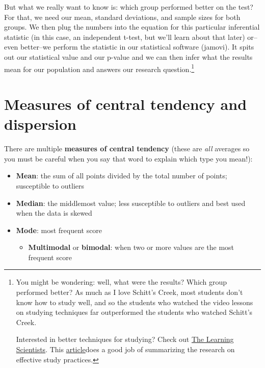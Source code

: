 \documentclass[
]{book}
\providecommand{\tightlist}{%
  \setlength{\itemsep}{0pt}\setlength{\parskip}{0pt}}
\begin{document}
But what we really want to know is: which group performed better on the test? For that, we need our mean, standard deviations, and sample sizes for both groups. We then plug the numbers into the equation for this particular inferential statistic (in this case, an independent t-test, but we'll learn about that later) or--even better--we perform the statistic in our statistical software (jamovi). It spits out our statistical value and our p-value and we can then infer what the results mean for our population and answers our research question.\footnote{You might be wondering: well, what were the results? Which group performed better? As much as I love Schitt's Creek, most students don't know how to study well, and so the students who watched the video lessons on studying techniques far outperformed the students who watched Schitt's Creek.

  Interested in better techniques for studying? Check out \href{https://www.learningscientists.org/blog/category/For+Students}{The Learning Scientists}. This \href{https://www.learningscientists.org/blog/2020/1/9-1}{article}does a good job of summarizing the research on effective study practices.}

\hypertarget{measures-of-central-tendency-and-dispersion}{%
\section{Measures of central tendency and dispersion}\label{measures-of-central-tendency-and-dispersion}}

There are multiple \textbf{measures of central tendency} (these are \emph{all} averages so you must be careful when you say that word to explain which type you mean!):

\begin{itemize}
\item
  \textbf{Mean}: the sum of all points divided by the total number of points; susceptible to outliers
\item
  \textbf{Median}: the middlemost value; less susceptible to outliers and best used when the data is skewed
\item
  \textbf{Mode}: most frequent score

  \begin{itemize}
  \tightlist
  \item
    \textbf{Multimodal} or \textbf{bimodal}: when two or more values are the most frequent score
  \end{itemize}
\end{itemize}
\end{document}
